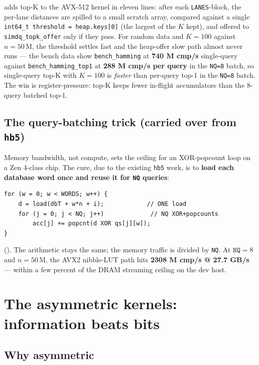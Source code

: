 \documentclass[11pt,a4paper]{article}
\begin{document}
 adds top-K to the AVX-512
kernel in eleven lines: after each \texttt{LANES}-block, the per-lane
distances are spilled to a small scratch array, compared against a
single \texttt{int64\_t threshold = heap.keys[0]} (the largest of the
$K$ kept), and offered to \texttt{simdq\_topk\_offer} only if they
pass. For random data and $K = 100$ against $n = 50\,\mathrm{M}$, the
threshold settles fast and the heap-offer slow path almost never runs
--- the bench data show \texttt{bench\_hamming} at \textbf{740 M
cmp/s} single-query against \texttt{bench\_hamming\_top1} at
\textbf{288 M cmp/s per query} in the \texttt{NQ=8} batch, so
single-query top-K with $K = 100$ is \emph{faster} than per-query
top-1 in the \texttt{NQ=8} batch. The win is register-pressure: top-K
keeps fewer in-flight accumulators than the 8-query batched top-1.

\subsection{The query-batching trick (carried over from \texttt{hb5})}

Memory bandwidth, not compute, sets the ceiling for an XOR-popcount
loop on a Zen 4-class chip. The cure, due to the existing \texttt{hb5}
work, is to \textbf{load each database word once and reuse it for
\texttt{NQ} queries}:

\begin{lstlisting}[style=cstyle]
for (w = 0; w < WORDS; w++) {
    d = load(dbT + w*n + i);            // ONE load
    for (j = 0; j < NQ; j++)             // NQ XOR+popcounts
        acc[j] += popcnt(d XOR qs[j][w]);
}
\end{lstlisting}

(). The arithmetic stays the
same; the memory traffic is divided by \texttt{NQ}. At
$\texttt{NQ} = 8$ and $n = 50\,\mathrm{M}$, the AVX2 nibble-LUT path
hits \textbf{2308 M cmp/s @ 27.7 GB/s} --- within a few percent of the
DRAM streaming ceiling on the dev host.

\section{The asymmetric kernels: information beats bits}

\subsection{Why asymmetric}
\end{document}

